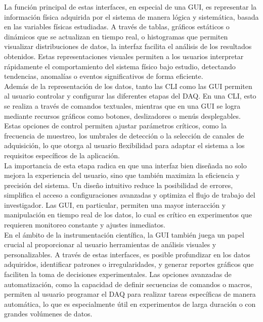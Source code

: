 \documentclass{report}
\begin{document}
\noindent La función principal de estas interfaces, en especial de una GUI, es representar la información física adquirida por el sistema de manera lógica y sistemática, basada en las variables físicas estudiadas. A través de tablas, gráficos estáticos o dinámicos que se actualizan en tiempo real, o histogramas que permiten visualizar distribuciones de datos, la interfaz facilita el análisis de los resultados obtenidos. Estas representaciones visuales permiten a los usuarios interpretar rápidamente el comportamiento del sistema físico bajo estudio, detectando tendencias, anomalías o eventos significativos de forma eficiente.\\

\noindent Además de la representación de los datos, tanto las CLI como las GUI permiten al usuario controlar y configurar las diferentes etapas del DAQ. En una CLI, esto se realiza a través de comandos textuales, mientras que en una GUI se logra mediante recursos gráficos como botones, deslizadores o menús desplegables. Estas opciones de control permiten ajustar parámetros críticos, como la frecuencia de muestreo, los umbrales de detección o la selección de canales de adquisición, lo que otorga al usuario flexibilidad para adaptar el sistema a los requisitos específicos de la aplicación.\\

\noindent La importancia de esta etapa radica en que una interfaz bien diseñada no solo mejora la experiencia del usuario, sino que también maximiza la eficiencia y precisión del sistema. Un diseño intuitivo reduce la posibilidad de errores, simplifica el acceso a configuraciones avanzadas y optimiza el flujo de trabajo del investigador. Las GUI, en particular, permiten una mayor interacción y manipulación en tiempo real de los datos, lo cual es crítico en experimentos que requieren monitoreo constante y ajustes inmediatos.\\

\noindent En el ámbito de la instrumentación científica, la GUI también juega un papel crucial al proporcionar al usuario herramientas de análisis visuales y personalizables. A través de estas interfaces, es posible profundizar en los datos adquiridos, identificar patrones o irregularidades, y generar reportes gráficos que faciliten la toma de decisiones experimentales. Las opciones avanzadas de automatización, como la capacidad de definir secuencias de comandos o macros, permiten al usuario programar el DAQ para realizar tareas específicas de manera automática, lo que es especialmente útil en experimentos de larga duración o con grandes volúmenes de datos.
\end{document}
